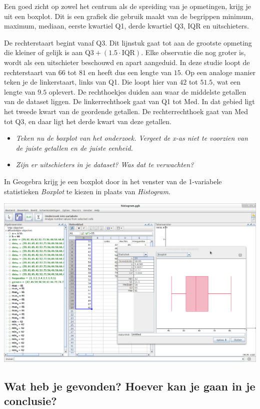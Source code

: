 \documentclass[11pt]{article}
\newcommand{\vraag}[2]{\begin{itemize}\item {\it #1} \vspace*{#2}\end{itemize}}
\begin{document}
Een goed zicht op zowel het centrum als de spreiding van je opmetingen, krijg je uit een boxplot. Dit
is een grafiek die gebruik maakt van de begrippen minimum, maximum, mediaan, eerste kwartiel
Q1, derde kwartiel Q3, IQR en uitschieters.

De rechterstaart begint vanaf Q3. Dit lijnstuk gaat tot aan de grootste opmeting die kleiner of
gelijk is aan $\mbox{Q3} + (1.5\cdot\mbox{IQR})$. Elke observatie die nog groter is, wordt als een uitschieter
beschouwd en apart aangeduid. In deze studie loopt de rechterstaart van $66$ tot $81$ en heeft
dus een lengte van $15$. Op een analoge manier teken je de linkerstaart, links van Q1. Die
loopt hier van $42$ tot $51.5$, wat een lengte van $9.5$ oplevert.
De rechthoekjes duiden aan waar de middelste getallen van de dataset liggen. De
linkerrechthoek gaat van Q1 tot Med. In dat gebied ligt het tweede kwart van de geordende
getallen. De rechterrechthoek gaat van Med tot Q3, en daar ligt het derde kwart van deze
getallen.

\vraag{Teken nu de boxplot van het onderzoek. Vergeet de x-as niet te voorzien van de juiste getallen en de juiste
eenheid.}{4cm}

\vraag{Zijn er uitschieters in je dataset? Was dat te verwachten?}{3cm}

In Geogebra krijg je een boxplot door in het venster van de 1-variabele statistieken {\it Boxplot} te kiezen in plaats van {\it Histogram}.

\begin{center}
  \includegraphics[width=14cm]{gg-boxplot}  
\end{center}

\subsection{Wat heb je gevonden? Hoever kan je gaan in je conclusie?}
\end{document}
